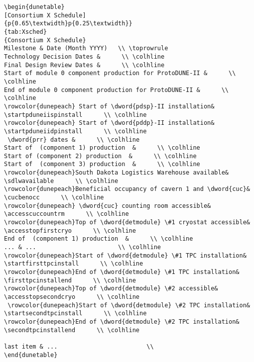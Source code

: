 \begin{verbatim}
\begin{dunetable}
[Consortium X Schedule]
{p{0.65\textwidth}p{0.25\textwidth}}
{tab:Xsched}
{Consortium X Schedule}   
Milestone & Date (Month YYYY)   \\ \toprowrule
Technology Decision Dates &      \\ \colhline
Final Design Review Dates &      \\ \colhline
Start of module 0 component production for ProtoDUNE-II &      \\ \colhline
End of module 0 component production for ProtoDUNE-II &      \\ \colhline
\rowcolor{dunepeach} Start of \dword{pdsp}-II installation& \startpduneiispinstall      \\ \colhline
\rowcolor{dunepeach} Start of \dword{pddp}-II installation& \startpduneiidpinstall      \\ \colhline
 \dword{prr} dates &      \\ \colhline
Start of  (component 1) production  &      \\ \colhline
Start of (component 2) production  &      \\ \colhline
Start of  (component 3) production  &      \\ \colhline
\rowcolor{dunepeach}South Dakota Logistics Warehouse available& \sdlwavailable      \\ \colhline
\rowcolor{dunepeach}Beneficial occupancy of cavern 1 and \dword{cuc}& \cucbenocc      \\ \colhline
\rowcolor{dunepeach} \dword{cuc} counting room accessible& \accesscuccountrm      \\ \colhline
\rowcolor{dunepeach}Top of \dword{detmodule} \#1 cryostat accessible& \accesstopfirstcryo      \\ \colhline
End of  (component 1) production  &      \\ \colhline
... & ...                       \\ \colhline
\rowcolor{dunepeach}Start of \dword{detmodule} \#1 TPC installation& \startfirsttpcinstall      \\ \colhline
\rowcolor{dunepeach}End of \dword{detmodule} \#1 TPC installation& \firsttpcinstallend      \\ \colhline
\rowcolor{dunepeach}Top of \dword{detmodule} \#2 accessible& \accesstopsecondcryo      \\ \colhline
 \rowcolor{dunepeach}Start of \dword{detmodule} \#2 TPC installation& \startsecondtpcinstall      \\ \colhline
\rowcolor{dunepeach}End of \dword{detmodule} \#2 TPC installation& \secondtpcinstallend      \\ \colhline

last item & ...                         \\
\end{dunetable}

\end{verbatim}

